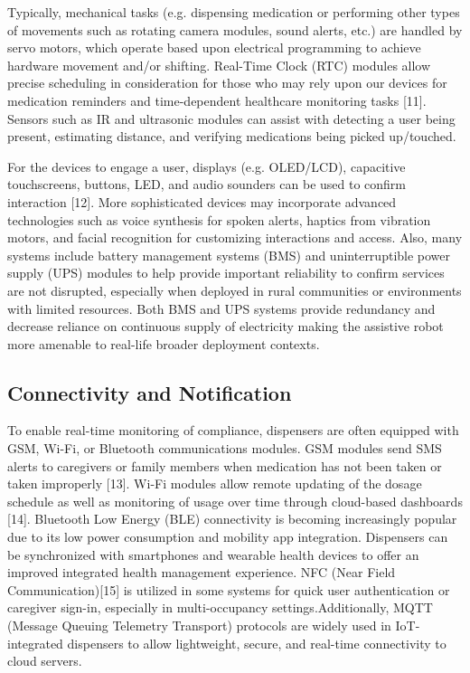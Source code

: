 Typically, mechanical tasks (e.g. dispensing medication or performing other types of movements such as rotating camera modules, sound alerts, etc.) are handled by servo motors, which operate based upon electrical programming to achieve hardware movement and/or shifting. Real-Time Clock (RTC) modules allow precise scheduling in consideration for those who may rely upon our devices for medication reminders and time-dependent healthcare monitoring tasks [11]. Sensors such as IR and ultrasonic modules can assist with detecting a user being present, estimating distance, and verifying medications being picked up/touched.

For the devices to engage a user, displays (e.g. OLED/LCD), capacitive touchscreens, buttons, LED, and audio sounders can be used to confirm interaction [12]. More sophisticated devices may incorporate advanced technologies such as voice synthesis for spoken alerts, haptics from vibration motors, and facial recognition for customizing interactions and access.
Also, many systems include battery management systems (BMS) and uninterruptible power supply (UPS) modules to help provide important reliability to confirm services are not disrupted, especially when deployed in rural communities or environments with limited resources. Both BMS and UPS systems provide redundancy and decrease reliance on continuous supply of electricity making the assistive robot more amenable to real-life broader deployment contexts.

\subsection{ Connectivity and Notification}
To enable real-time monitoring of compliance, dispensers are often equipped with GSM, Wi-Fi, or Bluetooth communications modules. GSM modules send SMS alerts to caregivers or family members when medication has not been taken or taken improperly [13]. Wi-Fi modules allow remote updating of the dosage schedule as well as monitoring of usage over time through cloud-based dashboards [14].
Bluetooth Low Energy (BLE) connectivity is becoming increasingly popular due to its low power consumption and mobility app integration. Dispensers can be synchronized with smartphones and wearable health devices to offer an improved integrated health management experience.
NFC (Near Field Communication)[15] is utilized in some systems for quick user authentication or caregiver sign-in, especially in multi-occupancy settings.Additionally, MQTT (Message Queuing Telemetry Transport) protocols are widely used in IoT-integrated dispensers to allow lightweight, secure, and real-time connectivity to cloud servers.


